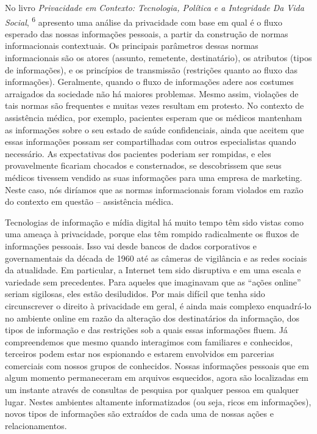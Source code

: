 No livro \emph{Privacidade em Contexto: Tecnologia, Política e a
Integridade Da Vida Social}, \textsuperscript{{6}} apresento uma análise
da privacidade com base em qual é o fluxo esperado das nossas
informações pessoais, a partir da construção de normas informacionais
contextuais. Os principais parâmetros dessas normas informacionais são
os atores (assunto, remetente, destinatário), os atributos (tipos de
informações), e os princípios de transmissão (restrições quanto ao fluxo
das informações). Geralmente, quando o fluxo de informações adere aos
costumes arraigados da sociedade não há maiores problemas. Mesmo assim,
violações de tais normas são frequentes e muitas vezes resultam em
protesto. No contexto de assistência médica, por exemplo, pacientes
esperam que os médicos mantenham as informações sobre o seu estado de
saúde confidenciais, ainda que aceitem que essas informações possam ser
compartilhadas com outros especialistas quando necessário. As
expectativas dos pacientes poderiam ser rompidas, e eles provavelmente
ficariam chocados e consternados, se descobrissem que seus médicos
tivessem vendido as suas informações para uma empresa de marketing.
Neste caso, nós diríamos que as normas informacionais foram violados em
razão do contexto em questão -- assistência médica.

Tecnologias de informação e mídia digital há muito tempo têm sido vistas
como uma ameaça à privacidade, porque elas têm rompido radicalmente os
fluxos de informações pessoais. Isso vai desde bancos de dados
corporativos e governamentais da década de 1960 até as câmeras de
vigilância e as redes sociais da atualidade. Em particular, a Internet
tem sido disruptiva e em uma escala e variedade sem precedentes. Para
aqueles que imaginavam que as ``ações online'' seriam sigilosas, eles
estão desiludidos. Por mais difícil que tenha sido circunscrever o
direito à privacidade em geral, é ainda mais complexo enquadrá-lo no
ambiente online em razão da alteração dos destinatários da informação,
dos tipos de informação e das restrições sob a quais essas informações
fluem. Já compreendemos que mesmo quando interagimos com familiares e
conhecidos, terceiros podem estar nos espionando e estarem envolvidos em
parcerias comerciais com nossos grupos de conhecidos. Nossas informações
pessoais que em algum momento permaneceram em arquivos esquecidos, agora
são localizadas em um instante através de consultas de pesquisa por
qualquer pessoa em qualquer lugar. Nestes ambientes altamente
informatizados (ou seja, ricos em informações), novos tipos de
informações são extraídos de cada uma de nossas ações e relacionamentos.

